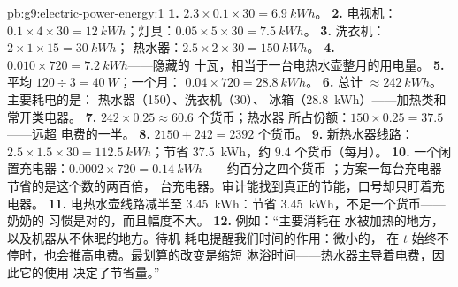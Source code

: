 \begin{solution}{pb:g9:electric-power-energy:1}
\textbf{1.} $2.3 \times 0.1 \times 30 = \qty{6.9}{kWh}$。
\textbf{2.} 电视机：$0.1 \times 4 \times 30 =
\qty{12}{kWh}$；灯具：$0.05 \times 5 \times 30 =
\qty{7.5}{kWh}$。
\textbf{3.} 洗衣机：$2 \times 1 \times 15 = \qty{30}{kWh}$；
热水器：$2.5 \times 2 \times 30 = \qty{150}{kWh}$。
\textbf{4.} $0.010 \times 720 = \qty{7.2}{kWh}$——隐藏的
十瓦，相当于一台电热水壶整月的用电量。
\textbf{5.} 平均 $120 \div 3 = \qty{40}{W}$；一个月：
$0.04 \times 720 = \qty{28.8}{kWh}$。
\textbf{6.} 总计 $\approx \qty{242}{kWh}$。主要耗电的是：
热水器（\qty{150}{}）、洗衣机（\qty{30}{}）、
冰箱（\qty{28.8}{kWh}）——加热类和常开类电器。
\textbf{7.} $242 \times 0.25 \approx 60.6$ 个货币；热水器
所占份额：$150 \times 0.25 = 37.5$——远超
电费的一半。
\textbf{8.} $2150 + 242 = 2392$ 个货币。
\textbf{9.} 新热水器线路：$2.5 \times 1.5 \times 30 =
\qty{112.5}{kWh}$；节省 \qty{37.5}{kWh}，约 $9.4$
个货币（每月）。
\textbf{10.} 一个闲置充电器：$0.0002 \times 720 =
\qty{0.14}{kWh}$——约百分之四个货币
；方案一每台充电器节省的是这个数的两百倍，
台充电器。审计能找到真正的节能，口号却只盯着充电器。
\textbf{11.} 电热水壶线路减半至 \qty{3.45}{kWh}：节省
\qty{3.45}{kWh}，不足一个货币——奶奶的
习惯是对的，而且幅度不大。
\textbf{12.} 例如：“主要消耗在
水被加热的地方，以及机器从不休眠的地方。待机
耗电提醒我们时间的作用：微小的，
在 $t$ 始终不停时，也会推高电费。最划算的改变是缩短
淋浴时间——热水器主导着电费，因此它的使用
决定了节省量。”
\end{solution}
